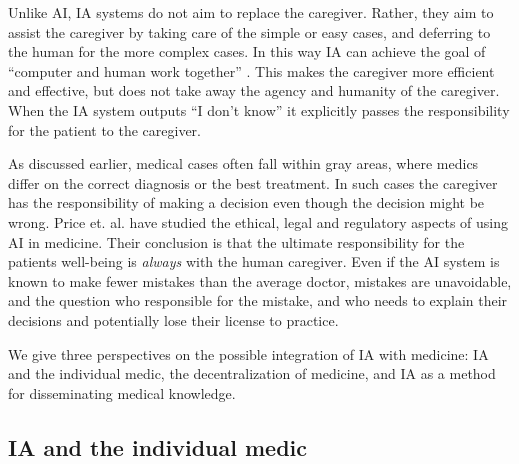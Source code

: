 \documentclass[11pt]{pnas-new}
\begin{document}
Unlike AI, IA systems do not aim to replace the caregiver. Rather,
they aim to assist the caregiver by taking care of the simple or easy
cases, and deferring to the human for the more complex cases. In this way IA can 
achieve the goal of ``computer and human work together'' \cite{verghese2018computer}. 
This makes the caregiver more efficient and effective, but does
not take away the agency and humanity of the caregiver. When the IA system outputs
``I don't know'' it explicitly passes the responsibility for the
patient to the caregiver.


As discussed earlier, medical cases often fall within gray areas, where
medics differ on the correct diagnosis or the best treatment. In such
cases the caregiver has the responsibility of making a decision even
though the decision might be wrong. Price et. al. have studied the ethical,
legal and regulatory aspects of using AI in
medicine.\cite{price2014black,ford2016privacy, price2017regulating}
Their conclusion is that the ultimate responsibility for the patients
well-being is {\em always} with the human caregiver. Even if the AI
system is known to make fewer mistakes than the average doctor,
mistakes are unavoidable, and the question who responsible for
the mistake, and who needs to explain their decisions and potentially lose their license to practice.


\iffalse

In this book the point is made that human error is inevitable.
\yoav{ What is the main point of this paper? \cite{donaldson2000err}}

\sout{
Today, and in the foreseeable
future, \sout {\color{blue}non-trivial efforts are needed to convert} medicine \sout{will not be}{\color{blue}to} a precise science. {\color{blue}Even if medicine fulfills precise science,} incorrect decisions {\color{blue}is inevitable due to human natures \cite{donaldson2000err}, and }
can result in harm or death.  }
\fi

We give three perspectives on the possible integration of IA with
medicine: IA and the individual medic, the decentralization of
medicine, and IA as a method for disseminating medical knowledge.

\subsection{IA and the individual medic}
\end{document}
